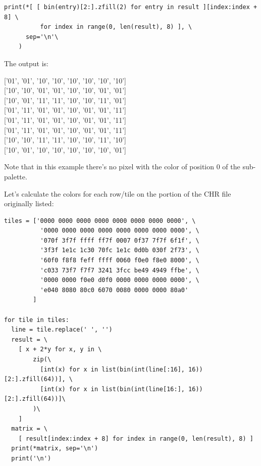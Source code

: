 \documentclass{article}
\begin{document}
\begin{lstlisting}
print(*[ [ bin(entry)[2:].zfill(2) for entry in result ][index:index + 8] \
          for index in range(0, len(result), 8) ], \
      sep='\n'\
    )
\end{lstlisting}

The output is:
\parbox{.45\linewidth}{
\begin{center}
  ['01', '01', '10', '10', '10', '10', '10', '10'] \\[0pt]
  ['10', '10', '01', '01', '10', '10', '01', '01'] \\[0pt]
  ['10', '01', '11', '11', '10', '10', '11', '01'] \\[0pt]
  ['01', '11', '01', '01', '10', '01', '01', '11'] \\[0pt]
  ['01', '11', '01', '01', '10', '01', '01', '11'] \\[0pt]
  ['01', '11', '01', '01', '10', '01', '01', '11'] \\[0pt]
  ['10', '10', '11', '11', '10', '10', '11', '10'] \\[0pt]
  ['10', '01', '10', '10', '10', '10', '10', '01'] \\[0pt]
\end{center}
}

\vskip 0.2in

Note that in this example there's no pixel with the color of position 0 of the sub-palette.

\vskip 0.2in

Let's calculate the colors for each row/tile on the portion of the CHR file originally listed:
\begin{lstlisting}
tiles = ['0000 0000 0000 0000 0000 0000 0000 0000', \
          '0000 0000 0000 0000 0000 0000 0000 0000', \
          '070f 3f7f ffff ff7f 0007 0f37 7f7f 6f1f', \
          '3f3f 1e1c 1c30 70fc 1e1c 0d0b 030f 2f73', \
          '60f0 f8f8 feff ffff 0060 f0e0 f8e0 8000', \
          'c033 73f7 f7f7 3241 3fcc be49 4949 ffbe', \
          '0000 0000 f0e0 d0f0 0000 0000 0000 0000', \
          'e040 8080 80c0 6070 0080 0000 0000 80a0' 
        ]

for tile in tiles:
  line = tile.replace(' ', '')
  result = \
    [ x + 2*y for x, y in \
        zip(\
          [int(x) for x in list(bin(int(line[:16], 16))[2:].zfill(64))], \
          [int(x) for x in list(bin(int(line[16:], 16))[2:].zfill(64))]\
        )\
    ]
  matrix = \
    [ result[index:index + 8] for index in range(0, len(result), 8) ]
  print(*matrix, sep='\n')
  print('\n')
\end{lstlisting}
\end{document}
